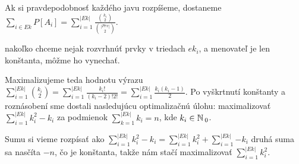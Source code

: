 Ak si pravdepodobnosť každého javu rozpíšeme, dostaneme 
$\sum_{i \in Ek}P[A_i] = \sum_{i = 1}^{|Ek|} \frac{{{k_i} \choose {2}}}{{{|Prv|} \choose {2}}}$.


nakoľko chceme nejak rozvrhnúť prvky v triedach $ek_i$, a menovateľ je len
konštanta, môžme ho vynechať.

Maximalizujeme teda hodnotu výrazu 
$\sum_{i = 1}^{|Ek|} {{k_i} \choose {2}} = \sum_{i = 1}^{|Ek|} {\frac{k_i!}{(k_i -2 )!2!}} = \sum_{i = 1}^{|Ek|}{\frac{k_i (k_i-1)}{2}}$.
Po vyškrtnutí konštanty a roznásobení sme dostali nasledujúcu optimalizačnú úlohu:
maximalizovať $\sum_{i = 1}^{|Ek|} {k_i^2 - k_i}$ za podmienok $\sum_{k=1}^{|Ek|}k_i = n$,
kde $k_i \in \mathbb{N}\,_0$.

Sumu si vieme rozpísať ako 
$\sum_{i = 1}^{|Ek|} {k_i^2 - k_i} = \sum_{i = 1}^{|Ek|} {k_i^2} + \sum_{i = 1}^{|Ek|}{-k_i}$
druhá suma sa nasčíta $-n$, čo je konštanta, takže nám stačí maximalizovať 
$\sum_{i = 1}^{|Ek|} {k_i^2}$.


